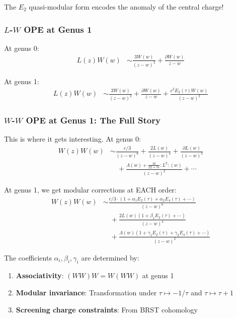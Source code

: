 \begin{example}
The $E_2$ quasi-modular form encodes the anomaly of the central charge!

\subsubsection{$L$-$W$ OPE at Genus 1}

At genus 0:
\begin{align}
L(z)W(w) &\sim \frac{3W(w)}{(z-w)^2} + \frac{\partial W(w)}{z-w}
\end{align}

At genus 1:
\begin{align}
L(z)W(w) &\sim \frac{3W(w)}{(z-w)^2} + \frac{\partial W(w)}{z-w} + \frac{c^2 E_2(\tau) W(w)}{(z-w)^2}
\end{align}

\subsubsection{$W$-$W$ OPE at Genus 1: The Full Story}

This is where it gets interesting. At genus 0:
\begin{align}
W(z)W(w) &\sim \frac{c/3}{(z-w)^6} + \frac{2L(w)}{(z-w)^4} + \frac{\partial L(w)}{(z-w)^3} \\
&\quad + \frac{\Lambda(w) + \frac{16}{22+5c} :L^2:(w)}{(z-w)^2} + \cdots
\end{align}

At genus 1, we get modular corrections at EACH order:
\begin{align}
W(z)W(w) &\sim \frac{c/3 \cdot (1 + \alpha_1 E_2(\tau) + \alpha_2 E_4(\tau) + \cdots)}{(z-w)^6} \\
&\quad + \frac{2L(w)(1 + \beta_1 E_2(\tau) + \cdots)}{(z-w)^4} \\
&\quad + \frac{\Lambda(w)(1 + \gamma_1 E_2(\tau) + \gamma_2 E_4(\tau) + \cdots)}{(z-w)^2}
\end{align}

The coefficients $\alpha_i, \beta_i, \gamma_i$ are determined by:
\begin{enumerate}
\item \textbf{Associativity}: $(WW)W = W(WW)$ at genus 1
\item \textbf{Modular invariance}: Transformation under $\tau \mapsto -1/\tau$ and $\tau \mapsto \tau+1$
\item \textbf{Screening charge constraints}: From BRST cohomology
\end{enumerate}


\end{example}
